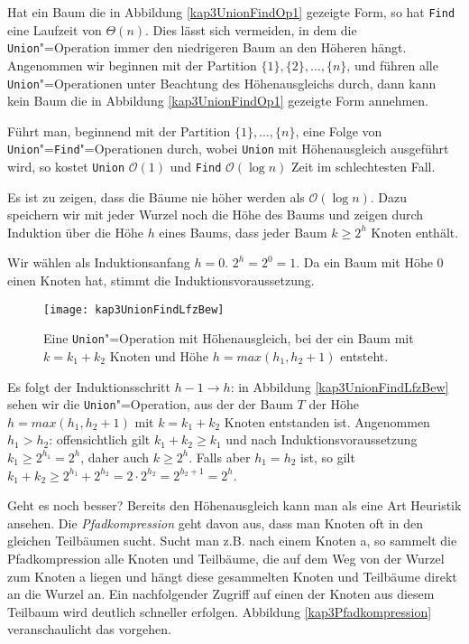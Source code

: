 Hat ein Baum die in Abbildung \vref{kap3UnionFindOp1} gezeigte Form, so hat \texttt{Find} eine Laufzeit von $\Theta(n)$. Dies lässt sich vermeiden, in dem die \texttt{Union}"=Operation immer den niedrigeren Baum an den Höheren hängt. Angenommen wir beginnen mit der Partition $\{1\}, \{2\}, \ldots, \{n\}$, und führen alle \texttt{Union}"=Operationen unter Beachtung des Höhenausgleichs durch, dann kann kein Baum die in Abbildung \vref{kap3UnionFindOp1} gezeigte Form annehmen.

\begin{Satz}
\hspace{\parindent}Führt man, beginnend mit der Partition $\{1\}, \ldots, \{n\}$, eine Folge von \texttt{Union}"=\texttt{Find}"=Operationen durch, wobei \texttt{Union} mit Höhenausgleich ausgeführt wird, so kostet \texttt{Union} $\mathcal{O}(1)$ und \texttt{Find} $\mathcal{O}(\log n)$ Zeit im schlechtesten Fall.
\end{Satz}

\begin{Bew}
\hspace{\parindent}Es ist zu zeigen, dass die Bäume nie höher werden als $\mathcal{O}(\log n)$. Dazu speichern wir mit jeder Wurzel noch die Höhe des Baums und zeigen durch Induktion über die Höhe $h$ eines Baums, dass jeder Baum $k \ge 2^h$ Knoten enthält.

Wir wählen als Induktionsanfang $h=0$. $2^h = 2^0 = 1$. Da ein Baum mit Höhe $0$ einen Knoten hat, stimmt die Induktionsvoraussetzung.

\begin{figure}[hbt]
  \centering
  \texttt{[image: kap3UnionFindLfzBew]}
  \caption{Eine \texttt{Union}"=Operation mit Höhenausgleich, bei der ein Baum mit $k=k_1 + k_2$ Knoten und Höhe $h= max(h_1, h_2 +1)$ entsteht.}
  \label{kap3UnionFindLfzBew}
\end{figure}

Es folgt der Induktionsschritt $h-1 \to h$: in Abbildung \vref{kap3UnionFindLfzBew} sehen wir die \texttt{Union}"=Operation, aus der der Baum $T$ der Höhe $h=max(h_1, h_2 +1)$ mit $k=k_1+k_2$ Knoten entstanden ist. Angenommen $h_1 > h_2$: offensichtlich gilt $k_1 + k_2 \ge k_1$ und nach Induktionsvoraussetzung $k_1 \ge 2^{h_1} = 2^h$, daher auch $k \ge 2^h$. Falls aber $h_1 = h_2$ ist, so gilt $k_1 + k_2 \ge 2^{h_1} + 2^{h_2} = 2 \cdot 2^{h_2} = 2^{h_2 +1} = 2^{h}$.
\end{Bew}

Geht es noch besser? Bereits den Höhenausgleich kann man als eine Art Heuristik ansehen. Die \textit{Pfadkompression} geht davon aus, dass man Knoten oft in den gleichen Teilbäumen sucht. Sucht man z.B. nach einem Knoten a, so sammelt die Pfadkompression alle Knoten und Teilbäume, die auf dem Weg von der Wurzel zum Knoten a liegen und hängt diese gesammelten Knoten und Teilbäume direkt an die Wurzel an. Ein nachfolgender Zugriff auf einen der Knoten aus diesem Teilbaum wird deutlich schneller erfolgen. Abbildung \vref{kap3Pfadkompression} veranschaulicht das vorgehen.

